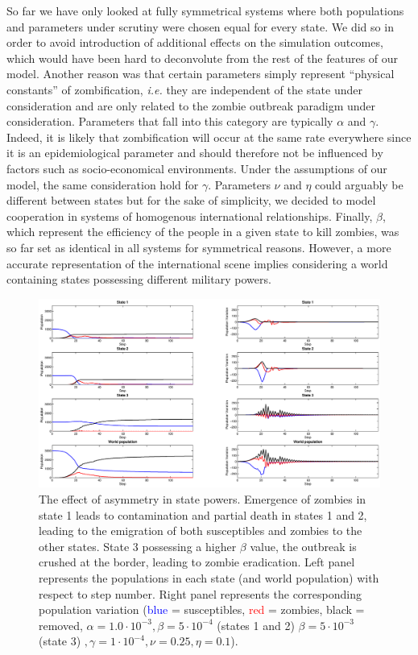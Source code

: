 \documentclass[11pt]{article} %
\begin{document}
So far we have only looked at fully symmetrical systems where both populations and parameters under scrutiny were chosen equal for every state. We did so in order to avoid introduction of additional effects on the simulation outcomes, which would have been hard to deconvolute from the rest of the features of our model. Another reason was that certain parameters simply represent ``physical constants'' of zombification, \textit{i.e.} they are independent of the state under consideration and are only related to the zombie outbreak paradigm under consideration. Parameters that fall into this category are typically $\alpha$ and $\gamma$. Indeed, it is likely that zombification will occur at the same rate everywhere since it is an epidemiological parameter and should therefore not be influenced by factors such as socio-economical environments. Under the assumptions of our model, the same consideration hold for $\gamma$. Parameters $\nu$ and $\eta$ could arguably be different between states but for the sake of simplicity, we decided to model cooperation in systems of homogenous international relationships. Finally, $\beta$, which represent the efficiency of the people in a given state to kill zombies, was so far set as identical in all systems for symmetrical reasons. However, a more accurate representation of the international scene implies considering a world containing states possessing different military powers. 

\begin{figure}[h!]
\centerline{
\includegraphics[scale=0.35]{../images/Matlab_figures/asymmetric-system.eps}}
\caption{The effect of asymmetry in state powers.  Emergence of zombies in state 1 leads to contamination and partial death in states 1 and 2, leading to the emigration of both susceptibles and zombies to the other states.  State 3 possessing a higher $\beta$ value, the outbreak is crushed at the border, leading to zombie eradication. Left panel represents the populations in each state (and world population) with respect to step number. Right panel represents the corresponding population variation (\textcolor{blue}{blue} = susceptibles, \textcolor{red}{red} = zombies, black = removed, $\alpha=1.0\cdot10^{-3}, \beta=5\cdot10^{-4} $ (states 1 and 2) $\beta=5\cdot10^{-3}$ (state 3) $, \gamma=1\cdot10^{-4}, \nu=0.25, \eta=0.1$). \label{basym} }
\end{figure}
\end{document}
